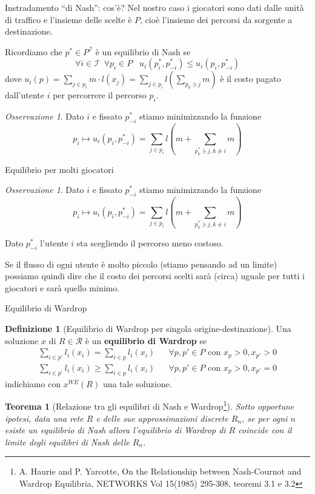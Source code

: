 \documentclass{beamer}
\newcounter{counter1}
\theoremstyle{plain}
\newtheorem{myteo}[counter1]{Teorema}
\theoremstyle{definition}
\newtheorem{mydef}[counter1]{Definizione}
\theoremstyle{remark}
\newtheorem{myoss}[counter1]{Osservazione}
\newcommand{\pa}[1]{\left(#1\right)}
\begin{document}
\begin{frame}{Instradamento ``di Nash'': cos'è?}
  Nel nostro caso i giocatori sono dati dalle unità di traffico e
  l'insieme delle scelte è $P$, cioè l'insieme dei percorsi da
  sorgente a destinazione.
  \vfill
  
  Ricordiamo che $p^* \in P^{\mathcal{I}}$ è un equilibrio di Nash se
  \[ \forall i\in \mathcal{I}\;\; \forall p_i \in P \;\;\;
    u_i\pa{p^*_i,p^*_{-i}} \le u_i\pa{p_i,p^*_{-i}} \] dove
  $u_i\pa{p} = \sum _{j\in p_i} m\cdot l(x_j) = \sum_{j\in p_i} l \pa{
    \sum _{p_k \ni j} m}$ è il costo pagato dall'utente $i$ per
  percorrere il percorso $p_i$.

  \begin{myoss}
    Dato $i$ e fissato $p^*_{-i}$ stiamo minimizzando la funzione
    \[ p_i \longmapsto u_i\pa{p_i,p^*_{-i}} = \sum_{j\in p_i} l \pa{ m
        + \sum _{p^*_k \ni j, k\neq i} m}\]
  \end{myoss}
\end{frame}

\begin{frame}{Equilibrio per molti giocatori}
  \begin{myoss}
    Dato $i$ e fissato $p^*_{-i}$ stiamo minimizzando la funzione
    \[ p_i \longmapsto u_i\pa{p_i,p^*_{-i}} = \sum_{j\in p_i} l \pa{ m
        + \sum _{p^*_k \ni j, k\neq i} m}\]
  \end{myoss}
  Dato $p^*_{-i}$ l'utente $i$ sta scegliendo il percorso meno
  costoso.
  \vfill
  
  Se il flusso di ogni utente è molto piccolo (stiamo pensando ad un
  limite) possiamo quindi dire che il costo dei percorsi scelti sarà
  (circa) uguale per tutti i giocatori e sarà quello minimo.
\end{frame}

\begin{frame}{Equilibrio di Wardrop}
  \begin{mydef}[Equilibrio di Wardrop per singola origine-destinazione]
    Una soluzione $x$ di $R\in \mathcal{R}$ è un \textbf{equilibrio di
      Wardrop} se
    \[
      \begin{matrix}
        \sum _{i\in p'} l_i(x_i) = \sum _{i\in p} l_i(x_i) & & \forall
        p,p'\in P \text{ con } x_p >0, x_{p'} >0 \\
        \sum _{i\in p'} l_i(x_i) \ge \sum _{i\in p} l_i(x_i) & & \forall
        p,p'\in P \text{ con } x_p >0, x_{p'} =0 
      \end{matrix}
    \]
    indichiamo con $x^{WE}(R)$ una tale soluzione.
  \end{mydef}

  \begin{myteo}[Relazione tra gli equilibri di Nash e
    Wardrop\footnote{A. Haurie and P. Yarcotte, On the Relationship
      between Nash-Cournot and Wardrop Equilibria, NETWORKS Vol 15(1985) 295-308, teoremi 3.1 e 3.2}]
    Sotto opportune ipotesi, data una rete $R$ e delle sue approssimazioni
    discrete $R_n$, se per ogni $n$ esiste un equilibrio di Nash allora
    l'equilibrio di Wardrop di $R$ coincide con il limite degli equilibri di
    Nash delle $R_n$.
  \end{myteo}
\end{frame}
\end{document}
